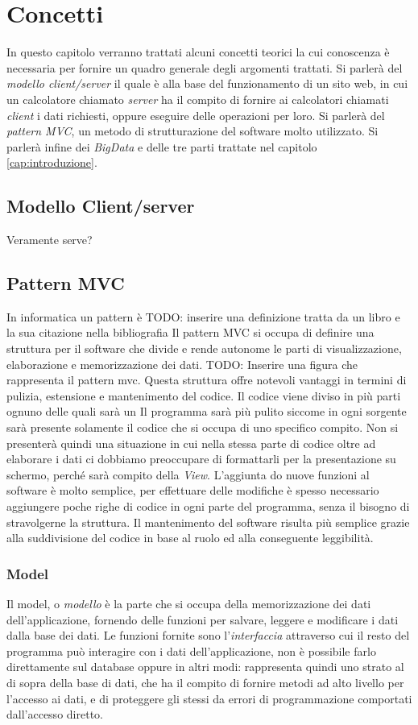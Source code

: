 \chapter{Concetti}%
In questo capitolo verranno trattati alcuni concetti teorici la cui conoscenza è necessaria per fornire un quadro generale degli argomenti trattati. Si parlerà del \emph{modello client/server} il quale è alla base del funzionamento di un sito web, in cui un calcolatore chiamato \emph{server} ha il compito di fornire ai calcolatori chiamati \emph{client} i dati richiesti, oppure eseguire delle operazioni per loro. Si parlerà del \emph{pattern MVC}, un metodo di strutturazione del software molto utilizzato. Si parlerà infine dei \emph{BigData} e delle tre parti trattate nel capitolo~ \ref{cap:introduzione}.
\section{Modello Client/server}%
Veramente serve?

\section{Pattern MVC}
In informatica un pattern è TODO: inserire una definizione tratta da un libro e la sua citazione nella bibliografia
Il pattern MVC si occupa di definire una struttura per il software che divide e rende autonome le parti di visualizzazione, elaborazione e memorizzazione dei dati.
TODO: Inserire una figura che rappresenta il pattern mvc.
Questa struttura offre notevoli vantaggi in termini di pulizia, estensione e mantenimento del codice. Il codice viene diviso in più parti ognuno delle quali sarà un Il programma sarà più pulito siccome in ogni sorgente sarà presente solamente il codice che si occupa di uno specifico compito. Non si presenterà quindi una situazione in cui nella stessa parte di codice oltre ad elaborare i dati ci dobbiamo preoccupare di formattarli per la presentazione su schermo, perché sarà compito della \emph{View}. L'aggiunta do nuove funzioni al software è molto semplice, per effettuare delle modifiche è spesso necessario aggiungere poche righe di codice in ogni parte del programma, senza il bisogno di stravolgerne la struttura. Il mantenimento del software risulta più semplice grazie alla suddivisione del codice in base al ruolo ed alla conseguente leggibilità.
\subsection{Model}
Il model, o \emph{modello} è la parte che si occupa della memorizzazione dei dati dell'applicazione, fornendo delle funzioni per salvare, leggere e modificare i dati dalla base dei dati. Le funzioni fornite sono l'\emph{interfaccia} attraverso cui il resto del programma può interagire con i dati dell'applicazione, non è possibile farlo direttamente sul database oppure in altri modi: rappresenta quindi uno strato al di sopra della base di dati, che ha il compito di fornire metodi ad alto livello per l'accesso ai dati, e di proteggere gli stessi da errori di programmazione comportati dall'accesso diretto.
